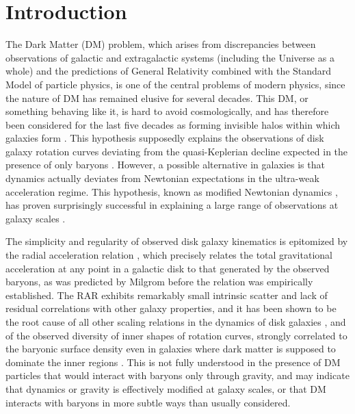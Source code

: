 \documentclass[reprint,nofootinbib,prd,aps]{revtex4-2}
\begin{document}
\maketitle

\section{Introduction}

The Dark Matter (DM) problem, which arises from discrepancies between observations of galactic and extragalactic systems (including the Universe as a whole) and the predictions of General Relativity combined with the Standard Model of particle physics, is one of the central problems of modern physics, since the nature of DM has remained elusive for several decades. This DM, or something behaving like it, is hard to avoid cosmologically, and has therefore been considered for the last five decades as forming invisible halos within which galaxies form \citep[e.g.,][]{White}. This hypothesis supposedly explains the observations of disk galaxy rotation curves deviating from the quasi-Keplerian decline expected in the presence of only baryons \citep[e.g.,][]{Bosma, Rubin}. However, a possible alternative in galaxies is that dynamics actually deviates from Newtonian expectations in the ultra-weak acceleration regime. This hypothesis, known as modified Newtonian dynamics \citep[MOND,][]{Milgrom83}, has proven surprisingly successful in explaining a large range of observations at galaxy scales \citep[e.g.,][]{FamaeyMcG, FamaeyDura}.

The simplicity and regularity of observed disk galaxy kinematics is epitomized by the radial acceleration relation \citep[RAR,][]{McGaugh,Lelli}, which precisely relates the total gravitational acceleration at any point in a galactic disk to that generated by the observed baryons, as was predicted by Milgrom \citep{Milgrom83} before the relation was empirically established. The RAR exhibits remarkably small intrinsic scatter and lack of residual correlations with other galaxy properties, and it has been shown to be the root cause of all other scaling relations in the dynamics of disk galaxies \citep{Stiskalek}, and of the observed diversity of inner shapes of rotation curves, strongly correlated to the baryonic surface density even in galaxies where dark matter is supposed to dominate the inner regions \citep[e.g.,][]{deBlok, Swaters, Ghari}. This is not fully understood in the presence of DM particles that would interact with baryons only through gravity, and may indicate that dynamics or gravity is effectively modified at galaxy scales, or that DM interacts with baryons in more subtle ways than usually considered.
\end{document}

